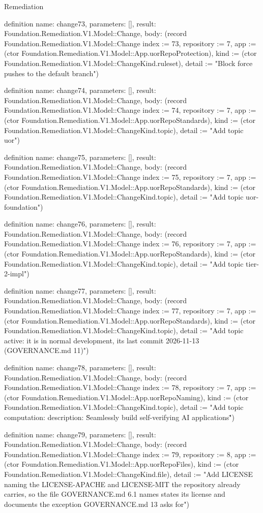 \begin{lexlean}{Remediation}
\begin{semanticmodule}
definition{
  name: change73,
  parameters: [],
  result: Foundation.Remediation.V1.Model::Change,
  body: (record Foundation.Remediation.V1.Model::Change {index := 73, repository := 7, app := (ctor Foundation.Remediation.V1.Model::App.uorRepoProtection), kind := (ctor Foundation.Remediation.V1.Model::ChangeKind.ruleset), detail := "Block force pushes to the default branch"})
}

definition{
  name: change74,
  parameters: [],
  result: Foundation.Remediation.V1.Model::Change,
  body: (record Foundation.Remediation.V1.Model::Change {index := 74, repository := 7, app := (ctor Foundation.Remediation.V1.Model::App.uorRepoStandards), kind := (ctor Foundation.Remediation.V1.Model::ChangeKind.topic), detail := "Add topic uor"})
}

definition{
  name: change75,
  parameters: [],
  result: Foundation.Remediation.V1.Model::Change,
  body: (record Foundation.Remediation.V1.Model::Change {index := 75, repository := 7, app := (ctor Foundation.Remediation.V1.Model::App.uorRepoStandards), kind := (ctor Foundation.Remediation.V1.Model::ChangeKind.topic), detail := "Add topic uor-foundation"})
}

definition{
  name: change76,
  parameters: [],
  result: Foundation.Remediation.V1.Model::Change,
  body: (record Foundation.Remediation.V1.Model::Change {index := 76, repository := 7, app := (ctor Foundation.Remediation.V1.Model::App.uorRepoStandards), kind := (ctor Foundation.Remediation.V1.Model::ChangeKind.topic), detail := "Add topic tier-2-impl"})
}

definition{
  name: change77,
  parameters: [],
  result: Foundation.Remediation.V1.Model::Change,
  body: (record Foundation.Remediation.V1.Model::Change {index := 77, repository := 7, app := (ctor Foundation.Remediation.V1.Model::App.uorRepoStandards), kind := (ctor Foundation.Remediation.V1.Model::ChangeKind.topic), detail := "Add topic active: it is in normal development, its last commit 2026-11-13 (GOVERNANCE.md 11)"})
}

definition{
  name: change78,
  parameters: [],
  result: Foundation.Remediation.V1.Model::Change,
  body: (record Foundation.Remediation.V1.Model::Change {index := 78, repository := 7, app := (ctor Foundation.Remediation.V1.Model::App.uorRepoNaming), kind := (ctor Foundation.Remediation.V1.Model::ChangeKind.topic), detail := "Add topic computation: description: \"Seamlessly build self-verifying AI applications\""})
}

definition{
  name: change79,
  parameters: [],
  result: Foundation.Remediation.V1.Model::Change,
  body: (record Foundation.Remediation.V1.Model::Change {index := 79, repository := 8, app := (ctor Foundation.Remediation.V1.Model::App.uorRepoFiles), kind := (ctor Foundation.Remediation.V1.Model::ChangeKind.file), detail := "Add LICENSE naming the LICENSE-APACHE and LICENSE-MIT the repository already carries, so the file GOVERNANCE.md 6.1 names states its license and documents the exception GOVERNANCE.md 13 asks for"})
}


\end{semanticmodule}
\end{lexlean}
